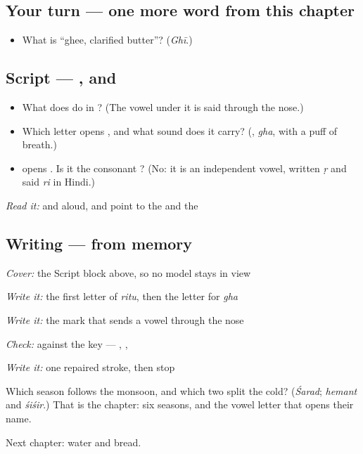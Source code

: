 \subsection*{Your turn — one more word from this chapter}
\begin{itemize}
\raggedright
  \item What is \textquotedblleft{}ghee, clarified butter\textquotedblright{}? (\emph{Ghī}.)
\end{itemize}

\subsection*{Script — ,  and }
\begin{itemize}
\raggedright
  \item What does \textbf{} do in \textbf{}? (The vowel under it is said through the nose.)
  \item Which letter opens \textbf{}, and what sound does it carry? (\textbf{}, \emph{gha}, with a puff of breath.)
  \item \textbf{} opens \textbf{}. Is it the consonant \textbf{}? (No: it is an independent vowel, written \emph{ṛ} and said \emph{ri} in Hindi.)
\end{itemize}

\emph{Read it:} \textbf{} and \textbf{} aloud, and point to the  and the 

\subsection*{Writing — from memory}
\emph{Cover:} the Script block above, so no model stays in view

\emph{Write it:} the first letter of \emph{ritu}, then the letter for \emph{gha}

\emph{Write it:} the mark that sends a vowel through the nose

\emph{Check:} against the key — \textbf{}, \textbf{}, \textbf{}

\emph{Write it:} one repaired stroke, then stop

\begin{tcolorbox}[breakable,colback=teal!4,colframe=teal!35!black,title={Before you move on}]
Which season follows the monsoon, and which two split the cold? (\emph{Śarad}; \emph{hemant} and \emph{śiśir}.) That is the chapter: six seasons, and the vowel letter that opens their name.

Next chapter: water and bread.
\end{tcolorbox}
